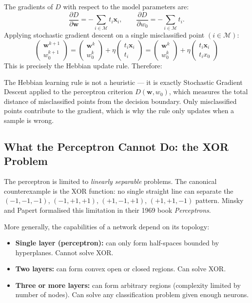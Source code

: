 \documentclass[11pt,a4paper]{article}
\begin{document}
The gradients of $D$ with respect to the model parameters are:
\[
\frac{\partial D}{\partial \mathbf{w}} = -\sum_{i \in \mathcal{M}} t_i \mathbf{x}_i, \qquad
\frac{\partial D}{\partial w_0} = -\sum_{i \in \mathcal{M}} t_i.
\]
Applying stochastic gradient descent on a single misclassified point $(i \in \mathcal{M})$:
\[
\begin{pmatrix} \mathbf{w}^{k+1} \\ w_0^{k+1} \end{pmatrix}
= \begin{pmatrix} \mathbf{w}^k \\ w_0^k \end{pmatrix}
+ \eta \begin{pmatrix} t_i \mathbf{x}_i \\ t_i \end{pmatrix}
= \begin{pmatrix} \mathbf{w}^k \\ w_0^k \end{pmatrix}
+ \eta \begin{pmatrix} t_i \mathbf{x}_i \\ t_i x_0 \end{pmatrix}
\]
This is precisely the Hebbian update rule. Therefore:

\begin{insightbox}[Hebbian learning = SGD on the perceptron criterion]
The Hebbian learning rule is not a heuristic — it is exactly Stochastic Gradient Descent applied to the perceptron criterion $D(\mathbf{w}, w_0)$, which measures the total distance of misclassified points from the decision boundary. Only misclassified points contribute to the gradient, which is why the rule only updates when a sample is wrong.
\end{insightbox}

\subsection{What the Perceptron Cannot Do: the XOR Problem}

The perceptron is limited to \emph{linearly separable} problems. The canonical counterexample is the XOR function: no single straight line can separate the $(-1,-1,-1)$, $(-1,+1,+1)$, $(+1,-1,+1)$, $(+1,+1,-1)$ pattern. Minsky and Papert formalised this limitation in their 1969 book \emph{Perceptrons}.

More generally, the capabilities of a network depend on its topology:
\begin{itemize}
  \item \textbf{Single layer (perceptron):} can only form half-spaces bounded by hyperplanes. Cannot solve XOR.
  \item \textbf{Two layers:} can form convex open or closed regions. Can solve XOR.
  \item \textbf{Three or more layers:} can form arbitrary regions (complexity limited by number of nodes). Can solve any classification problem given enough neurons.
\end{itemize}
\end{document}
